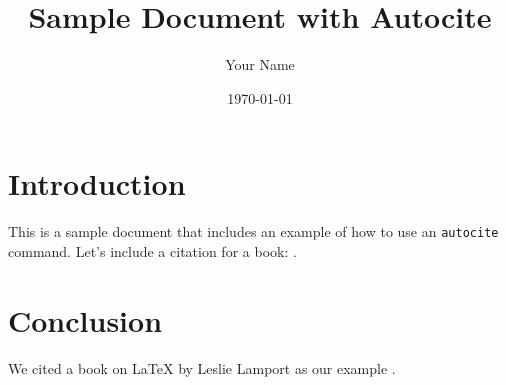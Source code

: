 \documentclass{article}
\begin{document}
\title{Sample Document with Autocite}
\author{Your Name}
\date{\today}
\maketitle

\section{Introduction}

This is a sample document that includes an example of how to use an \texttt{autocite} command. Let’s include a citation for a book: \autocite{yanSECONDSparselyEmbedded2018}.

\section{Conclusion}

We cited a book on LaTeX by Leslie Lamport as our example \autocite{zhouVoxelNetEndtoEndLearning2018}.

\printbibliography
\end{document}
